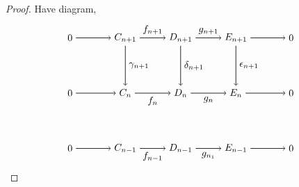 \documentclass[11.5pt, twoside, a4paper, titlepage]{report}
\theoremstyle{definition}
\theoremstyle{plain}
\begin{document}
\begin{proof}
Have diagram,
\begin{equation*}
\begin{tikzpicture}[->,-latex, auto, main path/.style={->, semithick}, main node/.style={}]

\node	[main node]		(2) at (2,0)		{$0$};
\node	[main node]		(3) at (4,0)		{$C_{n+1}$};
\node [main node]		(4) at (6,0)		{$D_{n+1}$};
\node [main node]		(5) at (8,0)		{$E_{n+1}$};
\node	[main node]		(11) at (10,0)	{$0$};


\node	[main node]		(7) at (2,-2)		{$0$};
\node	[main node]		(8) at (4,-2)		{$C_n$};
\node [main node]		(9) at (6,-2)		{$D_n$};
\node [main node]		(10) at (8,-2)	{$E_n$};
\node [main node]		(13) at (10,-2)	{$0$};


\node	[main node]		(14) at (2,-4)	{$0$};
\node	[main node]		(15) at (4,-4)	{$C_{n-1}$};
\node [main node]		(16) at (6,-4)	{$D_{n-1}$};
\node [main node]		(17) at (8,-4)	{$E_{n-1}$};
\node [main node]		(18) at (10,-4)	{$0$};

\draw (2) edge [main path] node [auto] {$$} (3);
\draw (3) edge [main path] node [auto] {$f_{n+1}$} (4);
\draw (4) edge [main path] node [auto] {$g_{n+1}$} (5);
\draw (5) edge [main path] (11);

\draw (7) edge [main path] node [auto] {$$} (8);
\draw (8) edge [main path] node [auto, swap] {$f_n$} (9);
\draw (9) edge [main path] node [auto, swap] {$g_n$} (10);
\draw (10) edge [main path] (13);

\draw (14) edge [main path] node [auto] {$$} (15);
\draw (15) edge [main path] node [auto, swap] {$f_{n-1}$} (16);
\draw (16) edge [main path] node [auto, swap] {$g_{n_1}$} (17);
\draw (17) edge [main path] (18);

\draw (3) edge [main path] node [auto] {$\gamma_{n+1}$} (8);
\draw (4) edge [main path] node [auto] {$\delta_{n+1}$} (9);
\draw (5) edge [main path] node [auto] {$\epsilon_{n+1}$} (10);


\end{tikzpicture}
\end{equation*}
\end{proof}
\end{document}
